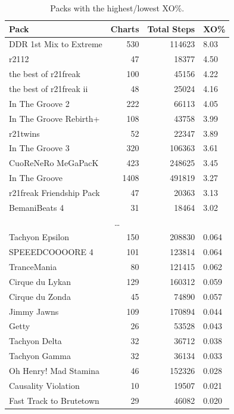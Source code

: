 \documentclass[10pt]{sigplanconf}
\begin{document}
\begin{table}[t]
	\begin{center}
		\small
	\begin{tabular}{l|r|r|l}
		\bf Pack & \bf Charts & \bf Total Steps & \bf XO\% \\
		\hline
		DDR 1st Mix to Extreme   &  530 & 114623 & 8.03 \\
		r2112                    &   47 &  18377 & 4.50 \\
		the best of r21freak     &  100 &  45156 & 4.22 \\
		the best of r21freak ii  &   48 &  25024 & 4.16 \\
		In The Groove 2          &  222 &  66113 & 4.05 \\
		In The Groove Rebirth+   &  108 &  43758 & 3.99 \\
		r21twins                 &   52 &  22347 & 3.89 \\
		In The Groove 3          &  320 & 106363 & 3.61 \\
		CuoReNeRo MeGaPacK       &  423 & 248625 & 3.45 \\
		In The Groove            & 1408 & 491819 & 3.27 \\
		r21freak Friendship Pack &   47 &  20363 & 3.13 \\
		BemaniBeats 4            &   31 &  18464 & 3.02 \\
		\multicolumn{4}{c}{\normalsize\dots} \\
		Tachyon Epsilon          &  150 & 208830 & 0.064 \\
		SPEEEDCOOOORE 4          &  101 & 123814 & 0.064 \\
		TranceMania              &   80 & 121415 & 0.062 \\
		Cirque du Lykan          &  129 & 160312 & 0.059 \\
		Cirque du Zonda          &   45 &  74890 & 0.057 \\
		Jimmy Jawns              &  109 & 170894 & 0.044 \\
		Getty                    &   26 &  53528 & 0.043 \\
		Tachyon Delta            &   32 &  36712 & 0.038 \\
		Tachyon Gamma            &   32 &  36134 & 0.033 \\
		Oh Henry! Mad Stamina    &   46 & 152326 & 0.028 \\
		Causality Violation      &   10 &  19507 & 0.021 \\
		Fast Track to Brutetown  &   29 &  46082 & 0.020 \\
	\end{tabular}
	\end{center}
	\caption{Packs with the highest/lowest XO\%.}
\end{table}
\end{document}

